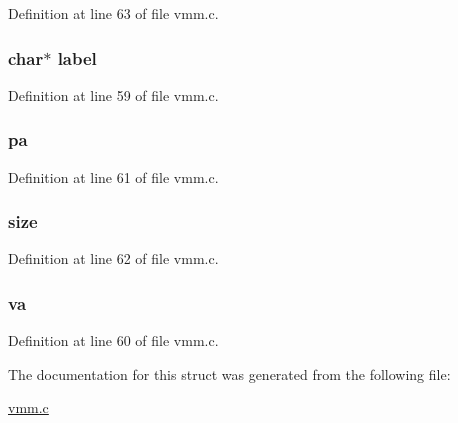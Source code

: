 \-Definition at line 63 of file vmm.\-c.

\hypertarget{structmemmap__desc_acf60de4c64d60c1b9449c056bc6bfcf7}{
\subsubsection[{label}]{\setlength{\rightskip}{0pt plus 5cm}char$\ast$ {\bf label}}}\label{structmemmap__desc_acf60de4c64d60c1b9449c056bc6bfcf7}


\-Definition at line 59 of file vmm.\-c.

\hypertarget{structmemmap__desc_ac3bd9bdf9d7c837b3f990461d5c7fb19}{
\subsubsection[{pa}]{ {\bf pa}}}\label{structmemmap__desc_ac3bd9bdf9d7c837b3f990461d5c7fb19}


\-Definition at line 61 of file vmm.\-c.

\hypertarget{structmemmap__desc_ab2c6b258f02add8fdf4cfc7c371dd772}{
\subsubsection[{size}]{ {\bf size}}}\label{structmemmap__desc_ab2c6b258f02add8fdf4cfc7c371dd772}


\-Definition at line 62 of file vmm.\-c.

\hypertarget{structmemmap__desc_a95ee4f2c3d5eef08e655768b207f5d61}{
\subsubsection[{va}]{ {\bf va}}}\label{structmemmap__desc_a95ee4f2c3d5eef08e655768b207f5d61}


\-Definition at line 60 of file vmm.\-c.



\-The documentation for this struct was generated from the following file\-:\begin{DoxyCompactItemize}
\item 
\hyperlink{vmm_8c}{vmm.\-c}\end{DoxyCompactItemize}
